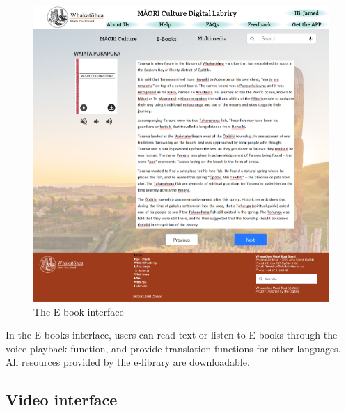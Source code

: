 \begin{figure}[htbp]
  \centerline{\includegraphics[width=400pt]{images/3-2-2.png}}
  \caption{The E-book interface}
  \label{fig30}
\end{figure}

In the E-books interface, users can read text or listen to E-books through the voice playback function, and provide translation functions for other languages. All resources provided by the e-library are downloadable.

\subsection{Video interface}

